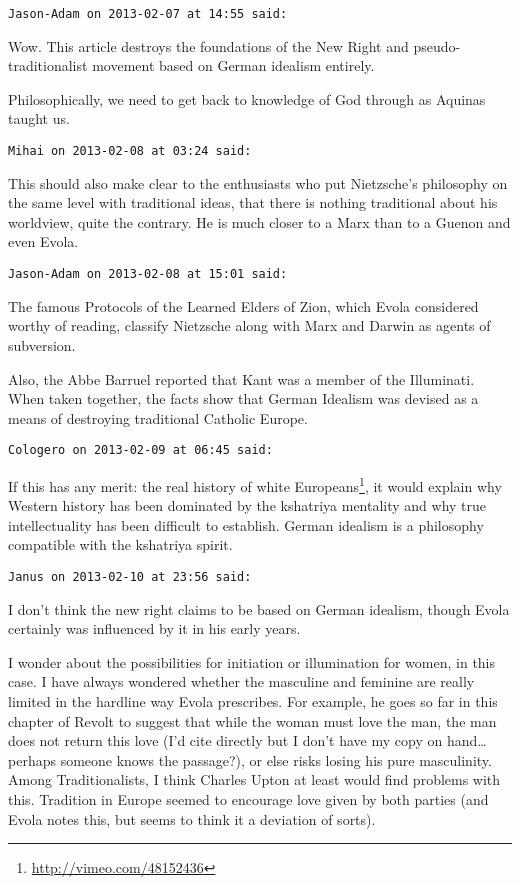 \begin{footnotesize}\begin{sffamily}



\texttt{Jason-Adam on 2013-02-07 at 14:55 said: }

Wow. This article destroys the foundations of the New Right and pseudo-traditionalist movement based on German idealism entirely.

Philosophically, we need to get back to knowledge of God through as Aquinas taught us.


\hfill

\texttt{Mihai on 2013-02-08 at 03:24 said: }

This should also make clear to the enthusiasts who put Nietzsche's philosophy on the same level with traditional ideas, that there is nothing traditional about his worldview, quite the contrary. He is much closer to a Marx than to a Guenon and even Evola.


\hfill

\texttt{Jason-Adam on 2013-02-08 at 15:01 said: }

The famous Protocols of the Learned Elders of Zion, which Evola considered worthy of reading, classify Nietzsche along with Marx and Darwin as agents of subversion.

Also, the Abbe Barruel reported that Kant was a member of the Illuminati. When taken together, the facts show that German Idealism was devised as a means of destroying traditional Catholic Europe.


\hfill

\texttt{Cologero on 2013-02-09 at 06:45 said: }

If this has any merit: the real history of white Europeans\footnote{\url{http://vimeo.com/48152436}}, it would explain why Western history has been dominated by the kshatriya mentality and why true intellectuality has been difficult to establish. German idealism is a philosophy compatible with the kshatriya spirit.


\hfill

\texttt{Janus on 2013-02-10 at 23:56 said: }

I don't think the new right claims to be based on German idealism, though Evola certainly was influenced by it in his early years.

I wonder about the possibilities for initiation or illumination for women, in this case. I have always wondered whether the masculine and feminine are really limited in the hardline way Evola prescribes. For example, he goes so far in this chapter of Revolt to suggest that while the woman must love the man, the man does not return this love (I'd cite directly but I don't have my copy on hand…perhaps someone knows the passage?), or else risks losing his pure masculinity. Among Traditionalists, I think Charles Upton at least would find problems with this. Tradition in Europe seemed to encourage love given by both parties (and Evola notes this, but seems to think it a deviation of sorts). 


\end{sffamily}
\end{footnotesize}
